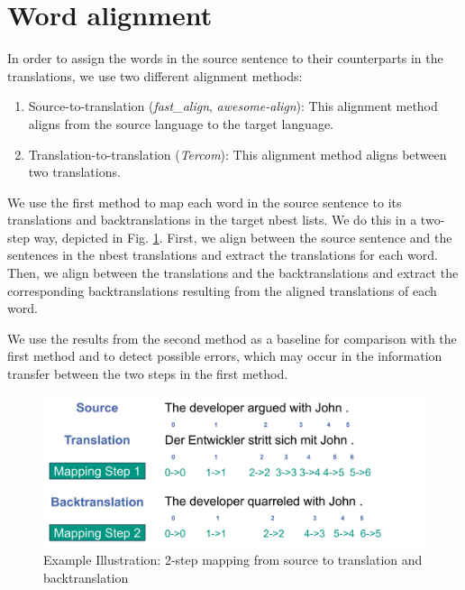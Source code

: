 
\section{Word alignment}
\label{sec:Experiments:Alignment}


In order to assign the words in the source sentence to their counterparts in the translations, we use two different alignment methods:

\begin{enumerate}
    \item Source-to-translation (\textit{fast\_align}, \textit{awesome-align}): This alignment method aligns from the source language to the target language.
    \item Translation-to-translation (\textit{Tercom}): This alignment method aligns between two translations.
\end{enumerate}

We use the first method to map each word in the source sentence to its translations and backtranslations in the target nbest lists. We do this in a two-step way, depicted in Fig. \ref{fig:alignment}. First, we align between the source sentence and the sentences in the nbest translations and extract the translations for each word. Then, we align between the translations and the backtranslations and extract the corresponding backtranslations resulting from the aligned translations of each word. 

We use the results from the second method as a baseline for comparison with the first method and to detect possible errors, which may occur in the information transfer between the two steps in the first method.

\begin{figure}
  \centering
  \includegraphics[scale=0.5]{figures/alignment.png}
  \caption{Example Illustration: 2-step mapping from source to translation and backtranslation}
  \label{fig:alignment}
\end{figure}

